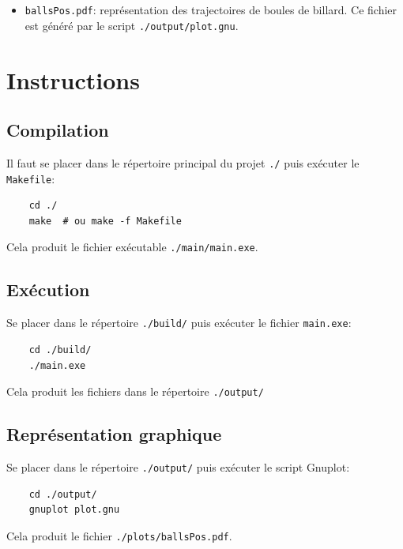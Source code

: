 \documentclass[12pt,a4paper]{article}
\newcommand{\myitem}{\item[$\triangleright$] }
\begin{document}
\begin{itemize}
    \myitem \texttt{ballsPos.pdf}: représentation des trajectoires de boules de billard. Ce fichier est généré par le script \texttt{./output/plot.gnu}.
\end{itemize}

\section{Instructions}

    \subsection{Compilation}

Il faut se placer dans le répertoire principal du projet \texttt{./} puis exécuter le \texttt{Makefile}:
\begin{verbatim}
    cd ./
    make  # ou make -f Makefile
\end{verbatim}
Cela produit le fichier exécutable \texttt{./main/main.exe}.

    \subsection{Exécution}

Se placer dans le répertoire \texttt{./build/} puis exécuter le fichier \texttt{main.exe}:
\begin{verbatim}
    cd ./build/
    ./main.exe
\end{verbatim}
Cela produit les fichiers dans le répertoire \texttt{./output/}

    \subsection{Représentation graphique}

Se placer dans le répertoire \texttt{./output/} puis exécuter le script Gnuplot:
\begin{verbatim}
    cd ./output/
    gnuplot plot.gnu
\end{verbatim}

Cela produit le fichier \texttt{./plots/ballsPos.pdf}.
\end{document}
